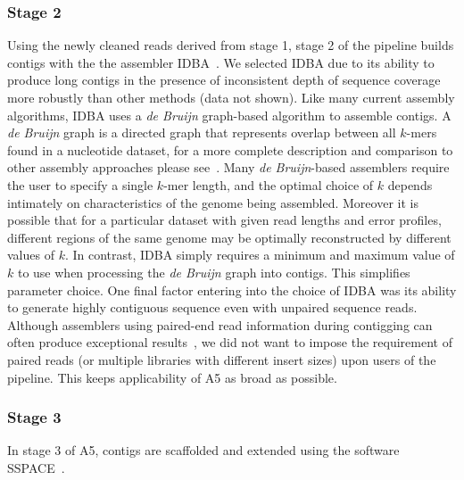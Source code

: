 \documentclass{bioinfo}
\begin{document}
\begin{methods}
\subsubsection{Stage 2}
Using the newly cleaned reads derived from stage 1, stage 2 of the pipeline builds contigs
with the the assembler IDBA~\citep{Peng2010}. We selected IDBA due 
to its ability to produce long contigs in the presence of inconsistent depth of sequence coverage more robustly than other methods (data not shown).
Like many current assembly algorithms, IDBA uses a \emph{de Bruijn} graph-based algorithm to assemble contigs. A \emph{de Bruijn} graph is a directed graph that represents overlap between all $k$-mers found in a nucleotide dataset, for a more complete description and comparison to other
assembly approaches please see~\citet{Pop2009}.
Many \emph{de Bruijn}-based assemblers require the user to specify a single $k$-mer length, and the optimal choice of $k$ depends intimately
on characteristics of the genome being assembled.  Moreover it is possible that for a particular dataset with given read lengths and error profiles, 
different regions of the same genome may be optimally reconstructed by different values of $k$. In contrast, IDBA simply requires a 
minimum and maximum value of
$k$ to use when processing the \emph{de Bruijn} graph into contigs. This simplifies parameter choice. 
One final factor entering into the choice of IDBA was its 
ability to generate highly contiguous sequence even with unpaired sequence reads. Although assemblers using paired-end read information during 
contigging can often produce exceptional results~\citep{Gnerre2011, SASSY}, we did not want to impose the requirement of paired reads (or multiple
libraries with different insert sizes) upon users of the pipeline. This keeps applicability of A5 as broad as possible.

\subsubsection{Stage 3}
In stage 3 of A5, contigs are scaffolded and extended using the software SSPACE~\citep{Boetzer2011}. %


\end{methods}
\end{document}
